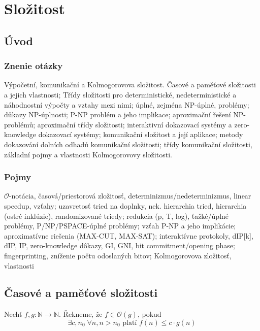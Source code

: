 \section{Složitost}

\subsection{Úvod}

\subsubsection{Znenie otázky}
Výpočetní, komunikační a Kolmogorovova složitost. Časové a paměťové 
složitosti a jejich vlastnosti; Třídy složitosti pro deterministické, 
nedeterministické a náhodnostní výpočty a vztahy mezi nimi; 
úplné, zejména NP-úplné, problémy; důkazy NP-úplnosti; 
P-NP problém a jeho implikace; aproximační řešení NP-problémů; 
aproximační třídy složitosti; interaktivní dokazovací systémy a 
zero-knowledge dokazovací systémy; komunikační složitost a její aplikace; 
metody dokazování dolních odhadů komunikační složitosti; 
třídy komunikační složitosti, základní pojmy a vlastnosti Kolmogorovovy složitosti. 

\subsubsection{Pojmy}
$\mathcal{O}$-notácia, časová/priestorová zložitosť, determinizmus/nedeterminizmus,
linear speedup, vzťahy; uzavretosť tried na doplnky, nek. hierarchia tried, 
hierarchia (ostré inklúzie), randomizované triedy; redukcia (p, T, log), 
ťažké/úplné problémy, P/NP/PSPACE-úplné problémy; vzťah P-NP a jeho
implikácie; aproximatívne riešenia (MAX-CUT, MAX-SAT); interaktívne protokoly,
dIP[k], dIP, IP, zero-knowledge dôkazy, GI, GNI, bit commitment/opening phase;
fingerprinting, zníženie počtu odoslaných bitov; Kolmogorovova zložitosť, vlastnosti

\subsection{Časové a paměťové složitosti}

\begin{definition}
    Nechť $f, g : \mathbb{N} \to \mathbb{N}$. Řekneme, že
    $f \in \mathcal{O}(g)$, pokud
    \[
        \exists c, n_0 \; \forall n, n > n_0
        \text{ platí }
        f(n) \leq c \cdot g(n)
    \]
\end{definition}

